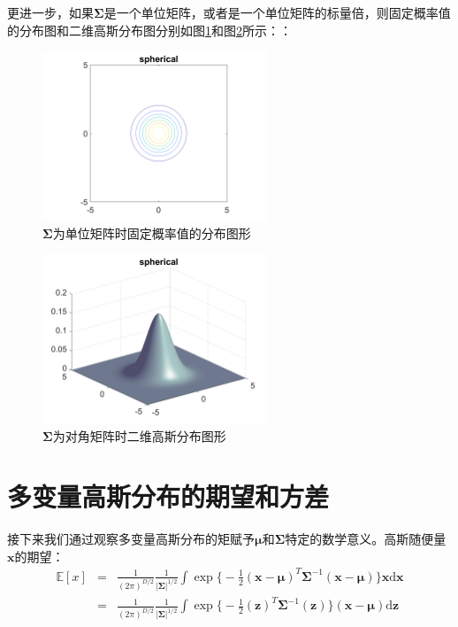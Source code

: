 \documentclass[10pt,a4paper,UTF8]{article}
\begin{document}
更进一步，如果\(\mathbf{\Sigma}\)是一个单位矩阵，或者是一个单位矩阵的标量倍，则固定概率值的分布图和二维高斯分布图分别如图\ref{fig:org6ee867a}和图\ref{fig:orgdf81471}所示：：
\begin{figure}[htbp]
\centering
\includegraphics[width=0.6\textwidth]{../../img/computer_prml/20170625figure2dgausseye.png}
\caption{\label{fig:org6ee867a}
\(\mathbf{\Sigma}\)为单位矩阵时固定概率值的分布图形}
\end{figure}

\begin{figure}[htbp]
\centering
\includegraphics[width=0.6\textwidth]{../../img/computer_prml/20170625figure2dgausseyesurface.png}
\caption{\label{fig:orgdf81471}
\(\mathbf{\Sigma}\)为对角矩阵时二维高斯分布图形}
\end{figure}


\section{多变量高斯分布的期望和方差}
\label{sec:org988ab49}


接下来我们通过观察多变量高斯分布的矩赋予\(\mathbf{\mu}\)和\(\mathbf{\Sigma}\)特定的数学意义。高斯随便量\(\mathbf{x}\)的期望：
\begin{eqnarray}
\label{eq:16}
\mathbb{E}[x]&=& \frac{1}{(2\pi)^{D/2}}\frac{1}{|\mathbf{\Sigma}|^{1/2}}\int \exp\bigg\{ -\frac{1}{2}(\mathbf{x}- \mathbf{\mu})^{T}\mathbf{\Sigma}^{-1}(\mathbf{x} - \mathbf{\mu})\bigg\}\mathbf{x}\mathrm{d}\mathbf{x} \\
&=& \frac{1}{(2\pi)^{D/2}}\frac{1}{|\mathbf{\Sigma}|^{1/2}}\int \exp\bigg\{ -\frac{1}{2}(\mathbf{z})^{T}\mathbf{\Sigma}^{-1}(\mathbf{z})\bigg\}(\mathbf{x}- \mathbf{\mu})\mathrm{d}\mathbf{z}
\end{eqnarray}
\end{document}
